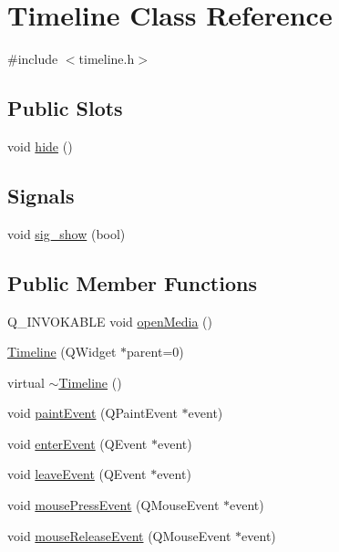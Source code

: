\hypertarget{class_timeline}{\section{\-Timeline \-Class \-Reference}
\label{class_timeline}
}


{\ttfamily \#include $<$timeline.\-h$>$}

\subsection*{\-Public \-Slots}
\begin{DoxyCompactItemize}
\item 
void \hyperlink{class_timeline_a0af9ee4fc6343347cbffc1ccdea5b6b5}{hide} ()
\end{DoxyCompactItemize}
\subsection*{\-Signals}
\begin{DoxyCompactItemize}
\item 
void \hyperlink{class_timeline_a46f6817048e17627fbb08e78b2d94828}{sig\-\_\-show} (bool)
\end{DoxyCompactItemize}
\subsection*{\-Public \-Member \-Functions}
\begin{DoxyCompactItemize}
\item 
\-Q\-\_\-\-I\-N\-V\-O\-K\-A\-B\-L\-E void \hyperlink{class_timeline_a0c8d0bbf652de8fcd63850ecd555e23f}{open\-Media} ()
\item 
\hyperlink{class_timeline_a0429486feb6b2a1baac4cc89148c0137}{\-Timeline} (\-Q\-Widget $\ast$parent=0)
\item 
virtual \hyperlink{class_timeline_a206e9a2a47a5c5fb0c935054b891e6fe}{$\sim$\-Timeline} ()
\item 
void \hyperlink{class_timeline_abed70c7b27020b2f84cc0ba8ba0f413b}{paint\-Event} (\-Q\-Paint\-Event $\ast$event)
\item 
void \hyperlink{class_timeline_a8f38f2ac8a0d14ecacddb6c0f2f313d2}{enter\-Event} (\-Q\-Event $\ast$event)
\item 
void \hyperlink{class_timeline_ae97432699e844cbc169f3afd0c89c53f}{leave\-Event} (\-Q\-Event $\ast$event)
\item 
void \hyperlink{class_timeline_a2c43c683af37dfaa70c973e61652e96b}{mouse\-Press\-Event} (\-Q\-Mouse\-Event $\ast$event)
\item 
void \hyperlink{class_timeline_ad18441ce861ff2141f72f9ce7e971bc9}{mouse\-Release\-Event} (\-Q\-Mouse\-Event $\ast$event)
\end{DoxyCompactItemize}
